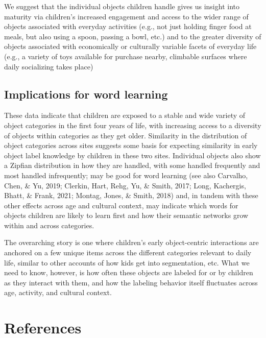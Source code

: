 \documentclass[10pt, letterpaper]{article}
\begin{document}
We suggest that the individual objects children handle gives us insight
into maturity via children's increased engagement and access to the
wider range of objects associated with everyday activities (e.g., not
just holding finger food at meals, but also using a spoon, passing a
bowl, etc.) and to the greater diversity of objects associated with
economically or culturally variable facets of everyday life (e.g., a
variety of toys available for purchase nearby, climbable surfaces where
daily socializing takes place)

\hypertarget{implications-for-word-learning}{%
\subsection{Implications for word
learning}\label{implications-for-word-learning}}

These data indicate that children are exposed to a stable and wide
variety of object categories in the first four years of life, with
increasing access to a diversity of objects within categories as they
get older. Similarity in the distribution of object categories across
sites suggests some basis for expecting similarity in early object label
knowledge by children in these two sites. Individual objects also show a
Zipfian distribution in how they are handled, with some handled
frequently and most handled infrequently; may be good for word learning
(see also Carvalho, Chen, \& Yu, 2019; Clerkin, Hart, Rehg, Yu, \&
Smith, 2017; Long, Kachergis, Bhatt, \& Frank, 2021; Montag, Jones, \&
Smith, 2018) and, in tandem with these other effects across age and
cultural context, may indicate which words for objects children are
likely to learn first and how their semantic networks grow within and
across categories.

The overarching story is one where children's early object-centric
interactions are anchored on a few unique items across the different
categories relevant to daily life, similar to other accounts of how kids
get into segmentation, etc. What we need to know, however, is how often
these objects are labeled for or by children as they interact with them,
and how the labeling behavior itself fluctuates across age, activity,
and cultural context.

\hypertarget{references}{%
\section{References}\label{references}}
\end{document}
